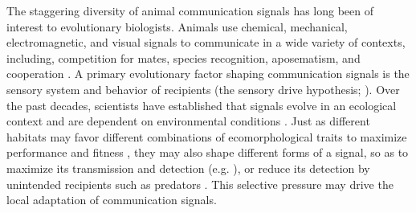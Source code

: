 The staggering diversity of animal communication signals has long been of interest to evolutionary biologists. Animals use chemical, mechanical, electromagnetic, and visual signals to communicate in a wide variety of contexts, including, competition for mates, species recognition, aposematism, and cooperation \citep{Bradbury2011}. A primary evolutionary factor shaping communication signals is the sensory system and behavior of recipients (the sensory drive hypothesis; \citealt{Endler1988,Endler1992,Endler1998}). Over the past decades, scientists have established that signals evolve in an ecological context and are dependent on environmental conditions \citep{Endler1992,Endler1993,Endler1993a}. Just as different habitats may favor different combinations of ecomorphological traits to maximize performance and fitness \citep{Arnold1983}, they may also shape different forms of a signal, so as to maximize its transmission and detection (e.g. \citealt{Seehausen1997}), or reduce its detection by unintended recipients such as predators \citep{Endler1984,Endler1990,Endler1991,Halfwerk2014}. This selective pressure may drive the local adaptation of communication signals.\\

